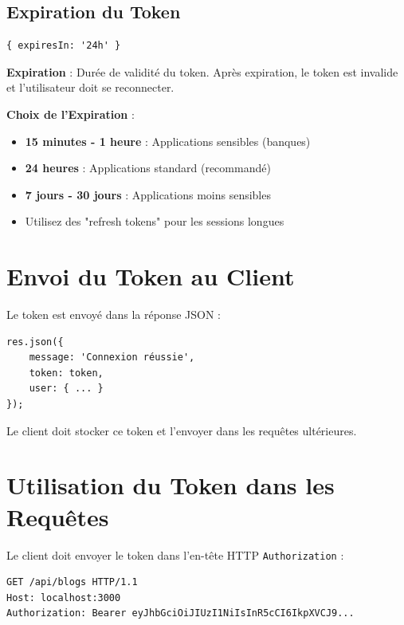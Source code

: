 \subsection{Expiration du Token}

\begin{lstlisting}[style=javascript]
{ expiresIn: '24h' }
\end{lstlisting}

\begin{definitionbox}
    \textbf{Expiration} : Durée de validité du token. Après expiration, le token est invalide et l'utilisateur doit se reconnecter.
\end{definitionbox}

\begin{bestpracticebox}
    \textbf{Choix de l'Expiration} :
    \begin{itemize}
        \item \textbf{15 minutes - 1 heure} : Applications sensibles (banques)
        \item \textbf{24 heures} : Applications standard (recommandé)
        \item \textbf{7 jours - 30 jours} : Applications moins sensibles
        \item Utilisez des "refresh tokens" pour les sessions longues
    \end{itemize}
\end{bestpracticebox}

\section{Envoi du Token au Client}

Le token est envoyé dans la réponse JSON :

\begin{lstlisting}[style=javascript]
res.json({
    message: 'Connexion réussie',
    token: token,
    user: { ... }
});
\end{lstlisting}

Le client doit stocker ce token et l'envoyer dans les requêtes ultérieures.

\section{Utilisation du Token dans les Requêtes}

Le client doit envoyer le token dans l'en-tête HTTP \texttt{Authorization} :

\begin{lstlisting}[style=bash, caption=Exemple de requête avec token]
GET /api/blogs HTTP/1.1
Host: localhost:3000
Authorization: Bearer eyJhbGciOiJIUzI1NiIsInR5cCI6IkpXVCJ9...
\end{lstlisting}

